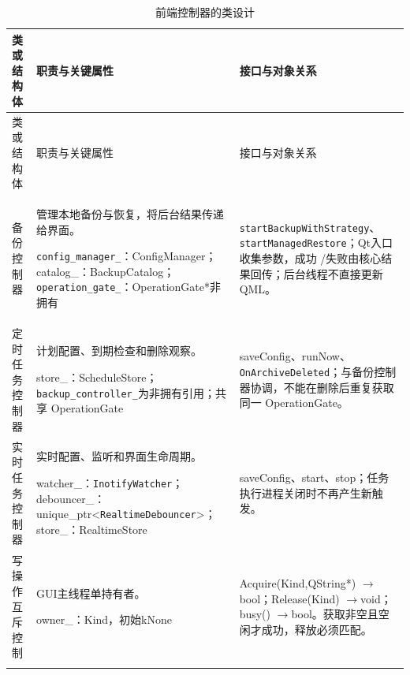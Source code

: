 \begin{longtable}{@{}L{.22\linewidth}L{.34\linewidth}L{.38\linewidth}@{}}
\caption{前端控制器的类设计}\label{tab:classes-0}\\
\toprule 类或结构体 & 职责与关键属性 & 接口与对象关系\\\midrule\endfirsthead
\toprule 类或结构体 & 职责与关键属性 & 接口与对象关系\\\midrule\endhead
\bottomrule\endfoot

备份控制器\par{} & 管理本地备份与恢复，将后台结果传递给界面。\par \nolinkurl{config\_manager\_}：ConfigManager；catalog\_：BackupCatalog；\nolinkurl{operation\_gate\_}：OperationGate*非拥有 & \nolinkurl{startBackupWithStrategy}、\nolinkurl{startManagedRestore}；Qt入口收集参数，成功 /\allowbreak 失败由核心结果回传；后台线程不直接更新 QML。\\\addlinespace[4pt]

定时任务控制器\par{} & 计划配置、到期检查和删除观察。\par store\_：ScheduleStore；\nolinkurl{backup\_controller\_}为非拥有引用；共享 OperationGate & saveConfig、runNow、\nolinkurl{OnArchiveDeleted}；与备份控制器协调，不能在删除后重复获取同一 OperationGate。\\\addlinespace[4pt]

实时任务控制器\par{} & 实时配置、监听和界面生命周期。\par watcher\_：\nolinkurl{InotifyWatcher}；debouncer\_：unique\_ptr<\allowbreak \nolinkurl{RealtimeDebouncer}>\allowbreak ；store\_：RealtimeStore & saveConfig、start、stop；任务执行进程关闭时不再产生新触发。\\\addlinespace[4pt]

写操作互斥控制\par{} & GUI主线程单持有者。\par owner\_：Kind，初始kNone & Acquire(Kind,QString*) $\to$\allowbreak bool；Release(Kind) $\to$\allowbreak void；busy() $\to$\allowbreak bool。获取非空且空闲才成功，释放必须匹配。\\\addlinespace[4pt]

\end{longtable}

